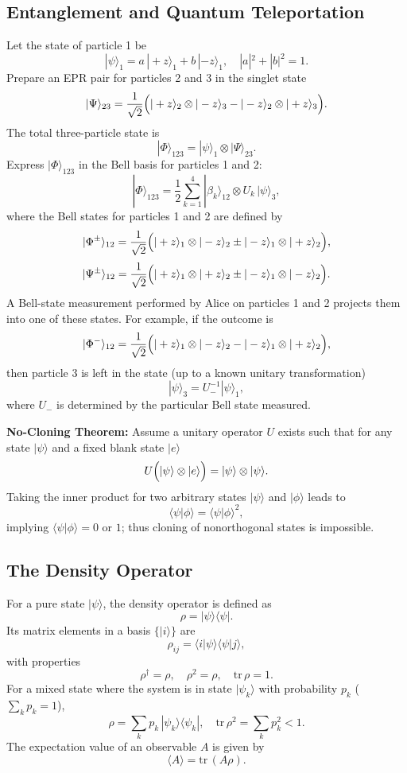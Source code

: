 \documentclass[twocolumn]{article}
\begin{document}
\begin{spacing}{1}
\subsection{Entanglement and Quantum Teleportation}
Let the state of particle 1 be 
\[
|\psi\rangle_1 = a\,|+z\rangle_1 + b\,|-z\rangle_1,\quad |a|^2+|b|^2=1.
\]
Prepare an EPR pair for particles 2 and 3 in the singlet state
\[
|\Psi\rangle_{23} = \frac{1}{\sqrt{2}}\Bigl(|+z\rangle_2\otimes|-z\rangle_3 - |-z\rangle_2\otimes|+z\rangle_3\Bigr).
\]
The total three-particle state is
\[
|\Phi\rangle_{123} = |\psi\rangle_1\otimes|\Psi\rangle_{23}.
\]
Express \( |\Phi\rangle_{123} \) in the Bell basis for particles 1 and 2:
\[
|\Phi\rangle_{123} = \frac{1}{2}\sum_{k=1}^4 |\beta_k\rangle_{12}\otimes U_k\,|\psi\rangle_3,
\]
where the Bell states for particles 1 and 2 are defined by
\[
|\Phi^\pm\rangle_{12} = \frac{1}{\sqrt{2}}\Bigl(|+z\rangle_1\otimes|-z\rangle_2 \pm |-z\rangle_1\otimes|+z\rangle_2\Bigr),
\]
\[
|\Psi^\pm\rangle_{12} = \frac{1}{\sqrt{2}}\Bigl(|+z\rangle_1\otimes|+z\rangle_2 \pm |-z\rangle_1\otimes|-z\rangle_2\Bigr).
\]
A Bell-state measurement performed by Alice on particles 1 and 2 projects them into one of these states. For example, if the outcome is
\[
|\Phi^-\rangle_{12}=\frac{1}{\sqrt{2}}\Bigl(|+z\rangle_1\otimes|-z\rangle_2 - |-z\rangle_1\otimes|+z\rangle_2\Bigr),
\]
then particle 3 is left in the state (up to a known unitary transformation)
\[
|\psi\rangle_3 = U_{-}^{-1}|\psi\rangle_1,
\]
where \(U_{-}\) is determined by the particular Bell state measured.  
\medskip

\textbf{No-Cloning Theorem:} Assume a unitary operator \(U\) exists such that for any state \( |\psi\rangle \) and a fixed blank state \(|e\rangle\)
\[
U\Bigl(|\psi\rangle\otimes|e\rangle\Bigr)=|\psi\rangle\otimes|\psi\rangle.
\]
Taking the inner product for two arbitrary states \(|\psi\rangle\) and \(|\phi\rangle\) leads to
\[
\langle\psi|\phi\rangle = \langle\psi|\phi\rangle^2,
\]
implying \(\langle\psi|\phi\rangle=0\) or \(1\); thus cloning of nonorthogonal states is impossible.
\medskip

\subsection{The Density Operator}
For a pure state \( |\psi\rangle \), the density operator is defined as
\[
\rho=|\psi\rangle\langle\psi|.
\]
Its matrix elements in a basis \(\{|i\rangle\}\) are
\[
\rho_{ij}=\langle i|\psi\rangle\langle\psi|j\rangle,
\]
with properties
\[
\rho^\dagger=\rho,\quad \rho^2=\rho,\quad \mathrm{tr}\,\rho=1.
\]
For a mixed state where the system is in state \(|\psi_k\rangle\) with probability \(p_k\) (\(\sum_k p_k=1\)),
\[
\rho=\sum_{k}p_k\,|\psi_k\rangle\langle\psi_k|,\quad \mathrm{tr}\,\rho^2=\sum_k p_k^2<1.
\]
The expectation value of an observable \(A\) is given by
\[
\langle A\rangle = \mathrm{tr}\,(A\rho).
\]
\medskip


\end{spacing}
\end{document}

